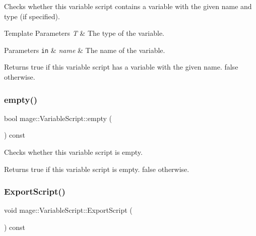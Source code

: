 Checks whether this variable script contains a variable with the given name and type (if specified).


\begin{DoxyTemplParams}{Template Parameters}
{\em T} & The type of the variable. \\
\hline
\end{DoxyTemplParams}

\begin{DoxyParams}[1]{Parameters}
\mbox{\tt in}  & {\em name} & The name of the variable. \\
\hline
\end{DoxyParams}
\begin{DoxyReturn}{Returns}
{\ttfamily true} if this variable script has a variable with the given name. {\ttfamily false} otherwise. 
\end{DoxyReturn}
\mbox{\label{classmage_1_1_variable_script_a8a3f47783455cd6264dfc996887fd0f0}} 
\subsubsection{\texorpdfstring{empty()}{empty()}}
{\footnotesize\ttfamily bool mage\+::\+Variable\+Script\+::empty (\begin{DoxyParamCaption}{ }\end{DoxyParamCaption}) const\hspace{0.3cm}{\ttfamily [noexcept]}}

Checks whether this variable script is empty.

\begin{DoxyReturn}{Returns}
{\ttfamily true} if this variable script is empty. {\ttfamily false} otherwise. 
\end{DoxyReturn}
\mbox{\label{classmage_1_1_variable_script_ab12b7f789f6af2b301ff350fa401b324}} 
\subsubsection{\texorpdfstring{Export\+Script()}{ExportScript()}\hspace{0.1cm}{\footnotesize\ttfamily [1/2]}}
{\footnotesize\ttfamily void mage\+::\+Variable\+Script\+::\+Export\+Script (\begin{DoxyParamCaption}{ }\end{DoxyParamCaption}) const}

